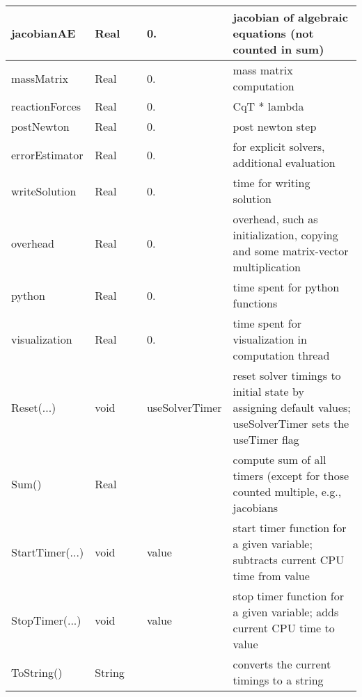 \begin{center}
\begin{longtable}{| p{4.2cm} | p{2.5cm} | p{0.3cm} | p{3.0cm} | p{6cm} |}
    jacobianAE &     Real &      &     0. &     jacobian of algebraic equations (not counted in sum)\\ \hline
    massMatrix &     Real &      &     0. &     mass matrix computation\\ \hline
    reactionForces &     Real &      &     0. &     CqT * lambda\\ \hline
    postNewton &     Real &      &     0. &     post newton step\\ \hline
    errorEstimator &     Real &      &     0. &     for explicit solvers, additional evaluation\\ \hline
    writeSolution &     Real &      &     0. &     time for writing solution\\ \hline
    overhead &     Real &      &     0. &     overhead, such as initialization, copying and some matrix-vector multiplication\\ \hline
    python &     Real &      &     0. &     time spent for python functions\\ \hline
    visualization &     Real &      &     0. &     time spent for visualization in computation thread\\ \hline
    Reset(...) &     void &      &     useSolverTimer &     reset solver timings to initial state by assigning default values; useSolverTimer sets the useTimer flag\\ \hline
    Sum() &     Real &      &      &     compute sum of all timers (except for those counted multiple, e.g., jacobians\\ \hline
    StartTimer(...) &     void &      &     value &     start timer function for a given variable; subtracts current CPU time from value\\ \hline
    StopTimer(...) &     void &      &     value &     stop timer function for a given variable; adds current CPU time to value\\ \hline
    ToString() &     String &      &      &     converts the current timings to a string\\ \hline
	  \end{longtable}
	\end{center}

